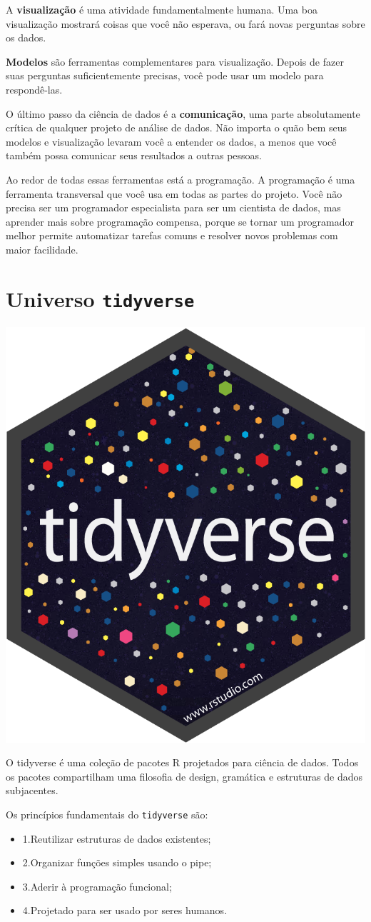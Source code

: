 \documentclass[]{book}
\providecommand{\tightlist}{%
  \setlength{\itemsep}{0pt}\setlength{\parskip}{0pt}}
\begin{document}
A \textbf{visualização} é uma atividade fundamentalmente humana. Uma boa visualização mostrará coisas que você não esperava, ou fará novas perguntas sobre os dados.

\textbf{Modelos} são ferramentas complementares para visualização. Depois de fazer suas perguntas suficientemente precisas, você pode usar um modelo para respondê-las.

O último passo da ciência de dados é a \textbf{comunicação}, uma parte absolutamente crítica de qualquer projeto de análise de dados. Não importa o quão bem seus modelos e visualização levaram você a entender os dados, a menos que você também possa comunicar seus resultados a outras pessoas.

Ao redor de todas essas ferramentas está a programação. A programação é uma ferramenta transversal que você usa em todas as partes do projeto. Você não precisa ser um programador especialista para ser um cientista de dados, mas aprender mais sobre programação compensa, porque se tornar um programador melhor permite automatizar tarefas comuns e resolver novos problemas com maior facilidade.

\hypertarget{universo-tidyverse}{%
\section{\texorpdfstring{Universo \texttt{tidyverse}}{Universo tidyverse}}\label{universo-tidyverse}}

\begin{center}\includegraphics[width=0.25\linewidth]{imagens/hex-tidyverse} \end{center}

O tidyverse é uma coleção de pacotes R projetados para ciência de dados. Todos os pacotes compartilham uma filosofia de design, gramática e estruturas de dados subjacentes.

Os princípios fundamentais do \texttt{tidyverse} são:

\begin{itemize}
\tightlist
\item
  1.Reutilizar estruturas de dados existentes;
\item
  2.Organizar funções simples usando o pipe;
\item
  3.Aderir à programação funcional;
\item
  4.Projetado para ser usado por seres humanos.
\end{itemize}
\end{document}
